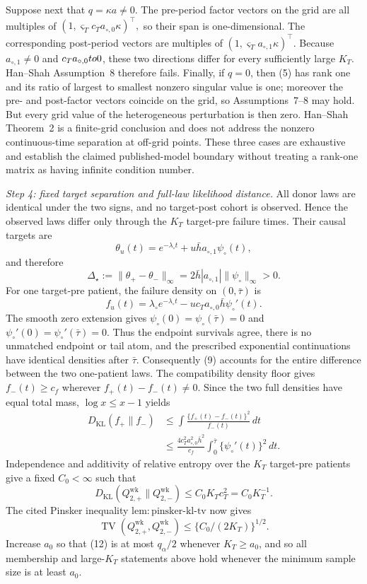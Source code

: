 Suppose next that \(q=\kappa a\ne0\).  The pre-period factor vectors on the grid are all multiples of
\(
 (1,\varsigma_Tc_Ta_{\circ,0}\kappa)^\top,
\)
so their span is one-dimensional.  The corresponding post-period vectors are multiples of
\(
 (1,\varsigma_Ta_{\circ,1}\kappa)^\top.
\)
Because \(a_{\circ,1}\ne0\) and \(c_Ta_{\circ,0}\\to0\), these two directions differ for every sufficiently large \(K_T\).  Han--Shah Assumption~8 therefore fails.  Finally, if \(q=0\), then (5) has rank one and its ratio of largest to smallest nonzero singular value is one; moreover the pre- and post-factor vectors coincide on the grid, so Assumptions~7--8 may hold.  But every grid value of the heterogeneous perturbation is then zero.  Han--Shah Theorem~2 is a finite-grid conclusion and does not address the nonzero continuous-time separation at off-grid points.  These three cases are exhaustive and establish the claimed published-model boundary without treating a rank-one matrix as having infinite condition number.

\emph{Step 4: fixed target separation and full-law likelihood distance.}
All donor laws are identical under the two signs, and no target-post cohort is observed.  Hence the observed laws differ only through the \(K_T\) target-pre failure times.  Their causal targets are
\[
 \theta_u(t)=e^{-\lambda_\circ t}+u\bar h a_{\circ,1}\psi_\circ(t),
\]
and therefore
\[
 \Delta_\star:=\|\theta_+-\theta_-\|_\infty
 =2\bar h|a_{\circ,1}|\|\psi_\circ\|_\infty>0.        \tag{8}
\]
For one target-pre patient, the failure density on \((0,\bar\tau)\) is
\[
 f_u(t)=\lambda_\circ e^{-\lambda_\circ t}
       -u c_Ta_{\circ,0}\bar h\psi_\circ'(t).          \tag{9}
\]
The smooth zero extension gives \(\psi_\circ(0)=\psi_\circ(\bar\tau)=0\) and \(\psi_\circ'(0)=\psi_\circ'(\bar\tau)=0\).  Thus the endpoint survivals agree, there is no unmatched endpoint or tail atom, and the prescribed exponential continuations have identical densities after \(\bar\tau\).  Consequently (9) accounts for the entire difference between the two one-patient laws.  The compatibility density floor gives \(f_-(t)\ge c_f\) wherever \(f_+(t)-f_-(t)\ne0\).  Since the two full densities have equal total mass, \(\log x\le x-1\) yields
\[
 \begin{aligned}
 D_{\mathrm{KL}}(f_+\|f_-)
 &\le\int\frac{\{f_+(t)-f_-(t)\}^2}{f_-(t)}\,dt\\
 &\le\frac{4c_T^2a_{\circ,0}^2\bar h^2}{c_f}
       \int_0^{\bar\tau}\{\psi_\circ'(t)\}^2\,dt.
 \end{aligned}                                          \tag{10}
\]
Independence and additivity of relative entropy over the \(K_T\) target-pre patients give a fixed \(C_0<\infty\) such that
\[
 D_{\mathrm{KL}}(Q_{2,+}^{\mathrm{wk}}\|Q_{2,-}^{\mathrm{wk}})
 \le C_0K_Tc_T^2=C_0K_T^{-1}.                           \tag{11}
\]
The cited Pinsker inequality \(\mathrm{lem:pinsker\mbox{-}kl\mbox{-}tv}\) now gives
\[
 \operatorname{TV}(Q_{2,+}^{\mathrm{wk}},Q_{2,-}^{\mathrm{wk}})
 \le\{C_0/(2K_T)\}^{1/2}.                              \tag{12}
\]
Increase \(a_0\) so that (12) is at most \(q_\alpha/2\) whenever \(K_T\ge a_0\), and so all membership and large-\(K_T\) statements above hold whenever the minimum sample size is at least \(a_0\).

